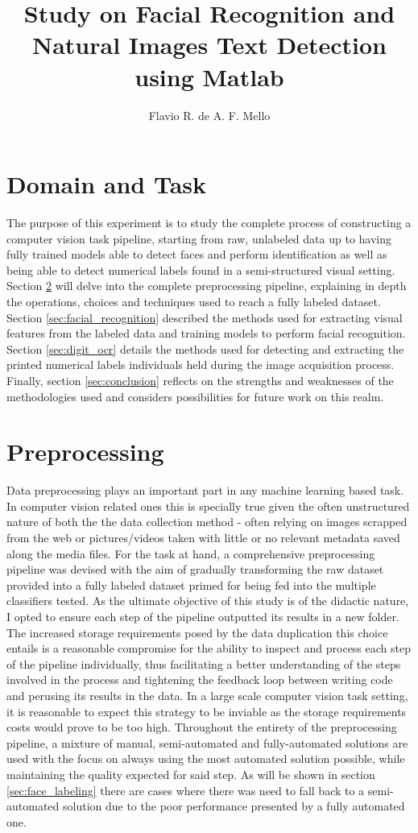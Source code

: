 \documentclass[11pt]{article}
\title{Study on Facial Recognition and Natural Images Text Detection using Matlab}
\author{Flavio R. de A. F. Mello}
\begin{document}
\maketitle

\section{Domain and Task}
    The purpose of this experiment is to study the complete process of constructing a computer vision task pipeline, starting from raw, unlabeled data up to having fully trained models able to detect faces and perform identification as well as being able to detect numerical labels found in a semi-structured visual setting. Section \ref{sec:preprocessing} will delve into the complete preprocessing pipeline, explaining in depth the operations, choices and techniques used to reach a fully labeled dataset. Section \ref{sec:facial_recognition} described the methods used for extracting visual features from the labeled data and training models to perform facial recognition. Section \ref{sec:digit_ocr} details the methods used for detecting and extracting the printed numerical labels individuals held during the image acquisition process. Finally, section \ref{sec:conclusion} reflects on the strengths and weaknesses of the methodologies used and considers possibilities for future work on this realm.

\section{Preprocessing}\label{sec:preprocessing}
    Data preprocessing plays an important part in any machine learning based task. In computer vision related ones this is specially true given the often unstructured nature of both the the data collection method - often relying on images scrapped from the web or pictures/videos taken with little or no relevant metadata saved along the media files. For the task at hand, a comprehensive preprocessing pipeline was devised with the aim of gradually transforming the raw dataset provided into a fully labeled dataset primed for being fed into the multiple classifiers tested. As the ultimate objective of this study is of the didactic nature, I opted to ensure each step of the pipeline outputted its results in a new folder. The increased storage requirements posed by the data duplication this choice entails is a reasonable compromise for the ability to inspect and process each step of the pipeline individually, thus facilitating a better understanding of the steps involved in the process and tightening the feedback loop between writing code and perusing its results in the data. In a large scale computer vision task setting, it is reasonable to expect this strategy to be inviable as the storage requirements costs would prove to be too high.
    Throughout the entirety of the preprocessing pipeline, a mixture of manual, semi-automated and fully-automated solutions are used with the focus on always using the most automated solution possible, while maintaining the quality expected for said step. As will be shown in section \ref{sec:face_labeling} there are cases where there was need to fall back to a semi-automated solution due to the poor performance presented by a fully automated one.
\end{document}
